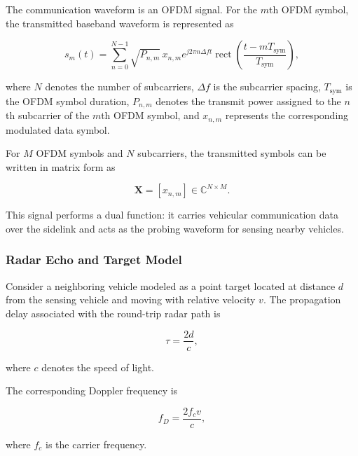 The communication waveform is an OFDM signal. For the $m$th OFDM symbol,
the transmitted baseband waveform is represented as

\begin{equation}
s_m(t)
=
\sum_{n=0}^{N-1}
\sqrt{P_{n,m}}\,
x_{n,m}
e^{j2\pi n\Delta f t}
\operatorname{rect}
\left(
\frac{t-mT_{\mathrm{sym}}}
{T_{\mathrm{sym}}}
\right),
\label{eq:isac_ofdm_tx}
\end{equation}

where $N$ denotes the number of subcarriers, $\Delta f$ is the
subcarrier spacing, $T_{\mathrm{sym}}$ is the OFDM symbol duration,
$P_{n,m}$ denotes the transmit power assigned to the $n$th subcarrier
of the $m$th OFDM symbol, and $x_{n,m}$ represents the corresponding
modulated data symbol.

For $M$ OFDM symbols and $N$ subcarriers, the transmitted symbols can be
written in matrix form as

\begin{equation}
\mathbf{X}
=
\left[
x_{n,m}
\right]
\in
\mathbb{C}^{N\times M}.
\label{eq:isac_symbol_matrix}
\end{equation}

This signal performs a dual function: it carries vehicular communication
data over the sidelink and acts as the probing waveform for sensing nearby
vehicles.

\subsubsection{Radar Echo and Target Model}

Consider a neighboring vehicle modeled as a point target located at distance
$d$ from the sensing vehicle and moving with relative velocity $v$. The
propagation delay associated with the round-trip radar path is

\begin{equation}
\tau
=
\frac{2d}{c},
\label{eq:isac_delay}
\end{equation}

where $c$ denotes the speed of light.

The corresponding Doppler frequency is

\begin{equation}
f_D
=
\frac{2f_c v}{c},
\label{eq:isac_doppler}
\end{equation}

where $f_c$ is the carrier frequency.

